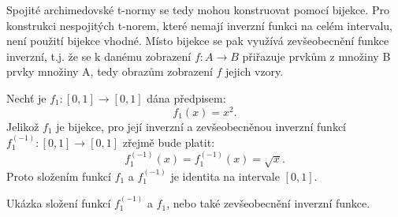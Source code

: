 Spojité archimedovské t-normy se tedy mohou konstruovat pomocí bijekce. Pro konstrukci nespojitých t-norem, které nemají inverzní funkci na celém intervalu, není použití bijekce vhodné. Místo bijekce se pak využívá zevšeobecnění funkce inverzní, t.j. že se k danému zobrazení $f: A \rightarrow B$ přiřazuje prvk\r um z množiny B prvky množiny A, tedy obraz\r um zobrazení $f$ jejich vzory.
\begin{example}
\cite{hlinena}
    Nech\v t je  $f_1:[0,1] \rightarrow [0,1]$  dána předpisem:
    $$f_1(x)=x^2.$$
    Jelikož $f_1$ je bijekce, pro její inverzní a zevšeobecněnou inverzní funkcí
    \newline$f_1^{(-1)}:[0,1] \rightarrow [0,1]$ zřejmě bude platit:
    $$f_1^{(-1)}(x)=f_1^{(-1)}(x)= \sqrt{x}.$$
    Proto složením funkcí $f_1$ a $f_1^{(-1)}$ je
    identita na intervale $[0,1].$
\end{example} 
\begin{graph} Ukázka složení funkcí $f_1^{(-1)} $ a $ f_1$, nebo také zevšeobecnění inverzní funkce.\\

\end{graph}

